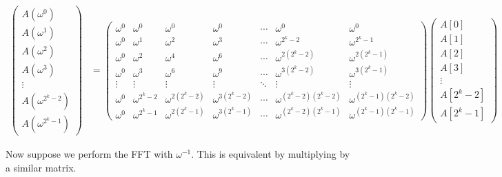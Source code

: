\begin{align*}
\begin{pmatrix}
A(\omega^0) \\ 
A(\omega^1) \\ 
A(\omega^2) \\ 
A(\omega^3) \\ 
\vdots \\
A(\omega^{2^k - 2}) \\
A(\omega^{2^k - 1})
\end{pmatrix}
&=
\begin{pmatrix}
\omega^0 & \omega^0 & \omega^0 & \omega^0 & \cdots & \omega^0 & \omega^0 \\ 
\omega^0 & \omega^1 & \omega^2 & \omega^3 & \cdots & \omega^{2^k-2} & \omega^{2^k-1} \\ 
\omega^0 & \omega^2 & \omega^4 & \omega^6 & \cdots & \omega^{2(2^k-2)} & \omega^{2(2^k-1)} \\ 
\omega^0 & \omega^3 & \omega^6 & \omega^9 & \cdots & \omega^{3(2^k-2)} & \omega^{3(2^k-1)} \\ 
\vdots   & \vdots   & \vdots   & \vdots   & \ddots & \vdots            & \vdots            \\
\omega^0 & \omega^{2^k - 2} & \omega^{2(2^k - 2)} & \omega^{3(2^k - 2)} & \cdots & \omega^{(2^k - 2)(2^k-2)} & \omega^{(2^k-1)(2^k - 2)} \\ 
\omega^0 & \omega^{2^k - 1} & \omega^{2(2^k - 1)} & \omega^{3(2^k - 1)} & \cdots & \omega^{(2^k - 2)(2^k-1)} & \omega^{(2^k-1)(2^k - 1)}
\end{pmatrix}
\begin{pmatrix}
A[0] \\ 
A[1] \\ 
A[2] \\ 
A[3] \\
\vdots \\
A[2^k - 2] \\
A[2^k - 1]
\end{pmatrix}
\end{align*}

Now suppose we perform the FFT with $\omega^{-1}$. This is equivalent by multiplying by a similar matrix.

\eject \pdfpagewidth=13in \pdfpageheight=11in

